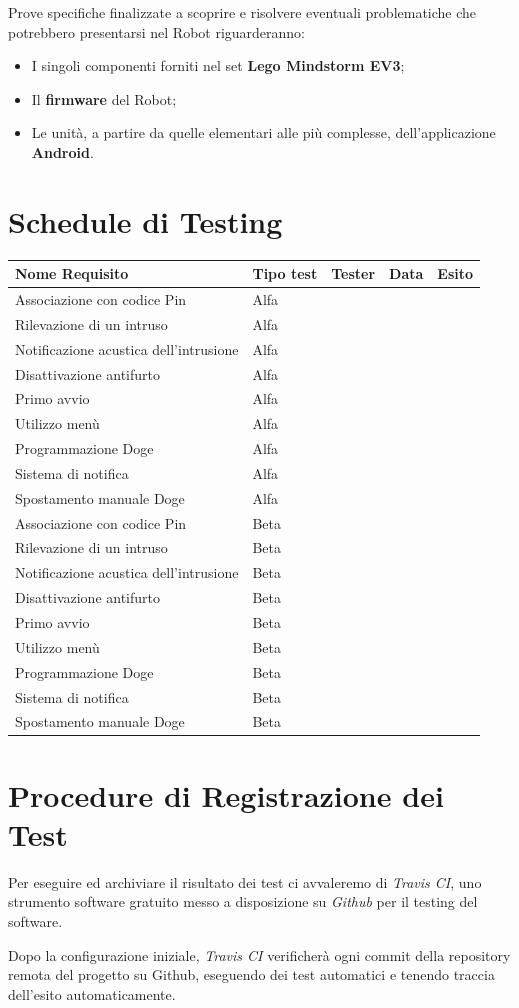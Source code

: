 \documentclass{article}
\begin{document}
Prove specifiche finalizzate a scoprire e risolvere eventuali
problematiche che potrebbero presentarsi nel Robot riguarderanno:
\begin{itemize}
    \item I singoli componenti forniti nel set \textbf{Lego Mindstorm EV3};
    \item Il \textbf{firmware} del Robot;
    \item Le unità, a partire da quelle elementari alle più complesse,
dell'applicazione \textbf{Android}.
\end{itemize}

\section{Schedule di Testing}

\begin{longtable}[]{@{}lllll@{}}
\toprule
Nome Requisito & Tipo test & Tester & Data & Esito\tabularnewline
\midrule
\endhead
Associazione con codice Pin & Alfa & & &\tabularnewline
Rilevazione di un intruso & Alfa & & &\tabularnewline
Notificazione acustica dell'intrusione & Alfa & & &\tabularnewline
Disattivazione antifurto & Alfa & & &\tabularnewline
Primo avvio & Alfa & & &\tabularnewline
Utilizzo menù & Alfa & & &\tabularnewline
Programmazione Doge & Alfa & & &\tabularnewline
Sistema di notifica & Alfa & & &\tabularnewline
Spostamento manuale Doge & Alfa & & &\tabularnewline
Associazione con codice Pin & Beta & & &\tabularnewline
Rilevazione di un intruso & Beta & & &\tabularnewline
Notificazione acustica dell'intrusione & Beta & & &\tabularnewline
Disattivazione antifurto & Beta & & &\tabularnewline
Primo avvio & Beta & & &\tabularnewline
Utilizzo menù & Beta & & &\tabularnewline
Programmazione Doge & Beta & & &\tabularnewline
Sistema di notifica & Beta & & &\tabularnewline
Spostamento manuale Doge & Beta & & &\tabularnewline
\bottomrule
\end{longtable}

\section{Procedure di Registrazione dei
Test}

Per eseguire ed archiviare il risultato dei test ci avvaleremo di
\emph{Travis CI}, uno strumento software gratuito messo a disposizione
su \emph{Github} per il testing del software.

Dopo la configurazione iniziale, \emph{Travis CI} verificherà ogni commit della repository remota del progetto su Github, eseguendo dei test automatici e tenendo traccia dell'esito automaticamente.
\end{document}
